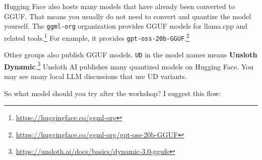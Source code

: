 \documentclass[a4paper,12pt]{article}
\begin{document}
Hugging Face also hosts many models that have already been converted to GGUF. That means you usually do not need to convert and quantize the model yourself. The \texttt{ggml-org} organization provides GGUF models for llama.cpp and related tools.\footnote{\url{https://huggingface.co/ggml-org}} For example, it provides \texttt{gpt-oss-20b-GGUF}.\footnote{\url{https://huggingface.co/ggml-org/gpt-oss-20b-GGUF}}

Other groups also publish GGUF models. \texttt{UD} in the model names means \textbf{Unsloth Dynamic}.\footnote{\url{https://unsloth.ai/docs/basics/dynamic-3.0-ggufs}} Unsloth AI publishes many quantized models on Hugging Face. You may see many local LLM discussions that use UD variants.

So what model should you try after the workshop? I suggest this flow:
\end{document}

